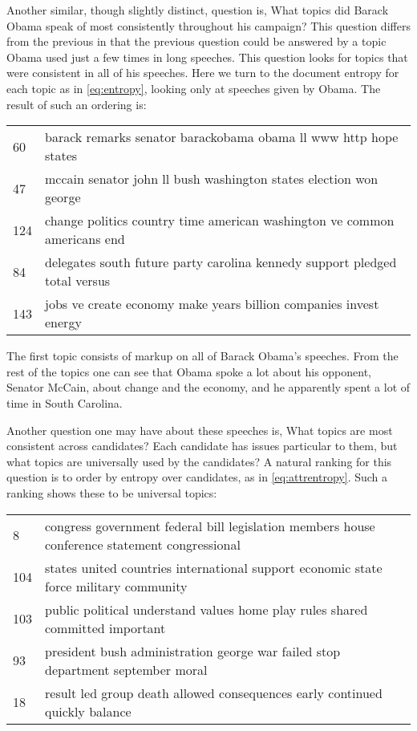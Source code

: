 \documentclass{article}
\begin{document}
Another similar, though slightly distinct, question is, What topics did Barack
Obama speak of most consistently throughout his campaign?  This question
differs from the previous in that the previous question could be answered by a
topic Obama used just a few times in long speeches.  This question looks for
topics that were consistent in all of his speeches.  Here we turn to the
document entropy for each topic as in \eqref{eq:entropy}, looking only at
speeches given by Obama.  The result of such an ordering is:

\begin{tabular}{l|l}
  60 &  barack remarks senator barackobama obama ll www http hope states\\
  47 & mccain senator john ll bush washington states election won george \\
  124 & change politics country time american washington ve common americans
	end \\
  84 & delegates south future party carolina kennedy support pledged total
	versus \\
  143 & jobs ve create economy make years billion companies invest energy \\
\end{tabular}

The first topic consists of markup on all of Barack Obama's speeches.  From the
rest of the topics one can see that Obama spoke a lot about his opponent,
Senator McCain, about change and the economy, and he apparently spent a lot of
time in South Carolina.

Another question one may have about these speeches is, What topics are most
consistent across candidates?  Each candidate has issues particular to them,
but what topics are universally used by the candidates?  A natural ranking for
this question is to order by entropy over candidates, as in
\eqref{eq:attrentropy}.  Such a ranking shows these to be universal topics:

\begin{tabular}{l|l}
  8 & congress government federal bill legislation members house conference
	statement congressional \\
  104 & states united countries international support economic state force
	military community \\
  103 & public political understand values home play rules shared committed
	important \\
  93 & president bush administration george war failed stop department
	september moral \\
  18 & result led group death allowed consequences early continued quickly
	balance \\
\end{tabular}
\end{document}

